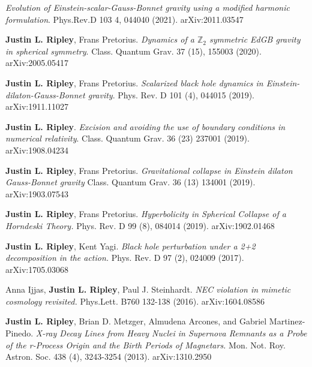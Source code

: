 \documentclass{my_cv}
\begin{document}
\begin{etaremune}
   \emph{Evolution of Einstein-scalar-Gauss-Bonnet gravity
      using a modified harmonic formulation}.
   Phys.Rev.D 103 4, 044040 (2021).
   arXiv:2011.03547
\item {\bf Justin L. Ripley}, Frans Pretorius. 
   \emph{Dynamics of a $\mathbb{Z}_2$ symmetric EdGB gravity in
      spherical symmetry}.
   Class. Quantum Grav. 37 (15), 155003 (2020).
   arXiv:2005.05417
\item {\bf Justin L. Ripley}, Frans Pretorius. 
   \emph{Scalarized black hole dynamics in
      Einstein-dilaton-Gauss-Bonnet gravity}.
   Phys. Rev. D 101 (4), 044015 (2019).
   arXiv:1911.11027
\item {\bf Justin L. Ripley}. 
   \emph{Excision and avoiding the use of boundary conditions
      in numerical relativity}.
   Class. Quantum Grav. 36 (23) 237001 (2019).  
   arXiv:1908.04234
\item {\bf Justin L. Ripley}, Frans Pretorius. 
   \emph{Gravitational collapse in Einstein
      dilaton Gauss-Bonnet gravity}
   Class. Quantum Grav. 36 (13) 134001 (2019).
   arXiv:1903.07543
\item {\bf Justin L. Ripley}, Frans Pretorius. 
   \emph{Hyperbolicity in Spherical Collapse of a Horndeski Theory.}
   Phys. Rev. D 99 (8), 084014 (2019).
   arXiv:1902.01468
\item {\bf Justin L. Ripley}, Kent Yagi. 
   \emph{Black hole perturbation under a 2+2 decomposition
      in the action.}
   Phys. Rev. D 97 (2), 024009 (2017).
   arXiv:1705.03068
\item Anna Ijjas, {\bf Justin L. Ripley}, Paul J. Steinhardt.
   \emph{NEC violation in mimetic cosmology revisited.}
   Phys.Lett. B760 132-138 (2016).
   arXiv:1604.08586
\item {\bf Justin L. Ripley}, Brian D. Metzger,	
      Almudena Arcones, and Gabriel Martinez-Pinedo.
   \emph{X-ray Decay Lines from Heavy Nuclei in
      Supernova Remnants as a Probe of the r-Process Origin
      and the Birth Periods of Magnetars.}
   Mon. Not. Roy. Astron. Soc. 438 (4), 3243-3254 (2013).
   arXiv:1310.2950
\end{etaremune}
\end{document}
